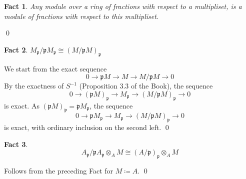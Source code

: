 \documentclass{article}
\newcommand{\mf}{\mathfrak}
\newcommand{\ppp}{\mf p}
\newtheorem{theorem}{Fact}[section]
\begin{document}
\begin{theorem}
Any module over a ring of fractions with respect to a multipliset, is a module of fractions with respect to this multipliset. 
\end{theorem}
\qed

\begin{theorem}
$M_\ppp/\ppp M_\ppp \cong (M/\ppp M)_\ppp$
\end{theorem}
We start from the exact sequence
\[
0 \rightarrow \ppp M \rightarrow M \rightarrow M/ \ppp M \rightarrow 0
\]
By the exactness of $S^{-1}$ (Proposition 3.3 of the Book), the sequence
\[
0 \rightarrow (\ppp M)_\ppp \rightarrow M_\ppp \rightarrow (M/\ppp M)_\ppp \rightarrow 0
\]
is exact. As $(\ppp M)_\ppp = \ppp M_\ppp$, the sequence
\[
0 \rightarrow \ppp M_\ppp \rightarrow M_\ppp \rightarrow (M/\ppp M)_\ppp \rightarrow 0
\]
is exact, with ordinary inclusion on the second left.
\qed

\vspace{1.5em}
\begin{theorem}
\[
A_\ppp / \ppp A_\ppp \otimes_A M \cong (A/\ppp)_\ppp \otimes_A M
\]
\end{theorem}
Follows from the preceding Fact for $M \coloneqq A$.
\qed

\vspace{1.5em}
\end{document}
